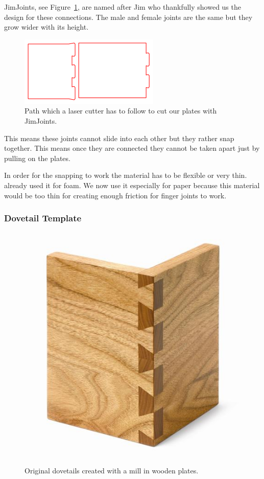\documentclass[../ClassicThesis.tex]{subfiles}
\begin{document}
JimJoints, see Figure~\ref{fig:jimJoints}, are named after Jim \citeauthor{jim} who thankfully showed us the design for these connections.
The male and female joints are the same but they grow wider with its height.

\begin{figure}[!ht]
\centering
\includegraphics[width=.5\columnwidth]{Images/jimjoints.png}
\caption{Path which a laser cutter has to follow to cut our plates with JimJoints.}
\label{fig:jimJoints}
\end{figure}

This means these joints cannot slide into each other but they rather snap together. This means once they are connected they cannot be taken apart just by pulling on the plates. 

In order for the snapping to work the material has to be flexible or very thin. \citeauthor{jim} already used it for foam. We now use it especially for paper because this material would be too thin for creating enough friction for finger joints to work.

\subsubsection{Dovetail Template}
\begin{figure}[!ht]
\centering
\includegraphics[width=.5\columnwidth]{Images/dovetails-wood.jpg}
\caption{Original dovetails created with a mill in wooden plates.}
\label{fig:realDovetailJoints}
\end{figure}
\end{document}
